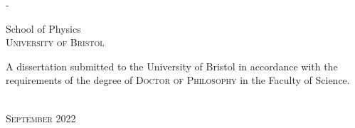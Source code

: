 \begin{titlingpage}
\begin{SingleSpace}
\begin{adjustwidth*}{\unitlength}{-\unitlength}
\begin{center}
\vspace{6mm}
{\large School of Physics\\
\textsc{University of Bristol}}\\
\vspace{11mm}
\begin{minipage}{10cm}
\begin{center}
A dissertation submitted to the University of Bristol in accordance with the requirements of the degree of \textsc{Doctor of Philosophy} in the Faculty of Science.
\end{center}
\end{minipage}\\
\vspace{9mm}
{\large\textsc{September 2022}}
\vspace{12mm}
\end{center}
\end{adjustwidth*}
\end{SingleSpace}
\end{titlingpage}